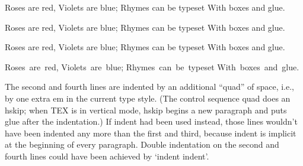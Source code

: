 {\obeylines\smallskip
Roses are red,
\indent Violets are blue;
Rhymes can be typeset
\indent With boxes and glue.
\smallskip}

{\obeylines\smallskip
Roses are red,
\quad Violets are blue;
Rhymes can be typeset
\quad With boxes and glue.
\smallskip}

{\obeylines\smallskip
Roses are red,
\indent\indent  Violets are blue;
Rhymes can be typeset
\indent\indent  With boxes and glue.
\smallskip}

\vbox{
\hbox{Roses are red,}
\hbox{\indent Violets are blue;}
\hbox{Rhymes can be typeset}
\hbox{\indent With boxes and glue.}
}

The second and fourth lines are indented by an additional “quad” of space,
i.e., by one extra em in the current type style. (The control sequence quad does an
hskip; when TEX is in vertical mode, hskip begins a new paragraph and puts glue
after the indentation.) If indent had been used instead, those lines wouldn’t have
been indented any more than the first and third, because indent is implicit at the
beginning of every paragraph. Double indentation on the second and fourth lines could
have been achieved by ‘indent indent’.


\bye
